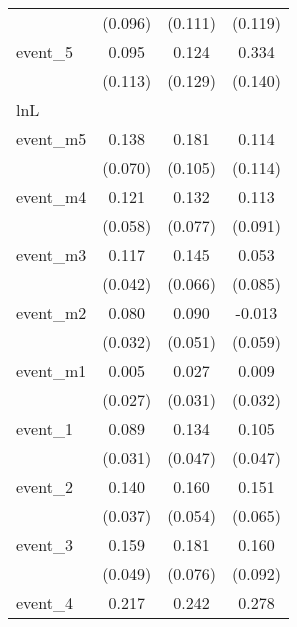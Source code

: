 {\begin{tabular}{l*{3}{c}}
            &     (0.096)         &     (0.111)         &     (0.119)         \\
[1em]
event\_5     &       0.095         &       0.124         &       0.334\sym{*}  \\
            &     (0.113)         &     (0.129)         &     (0.140)         \\
\hline
lnL         &                     &                     &                     \\
event\_m5    &       0.138\sym{*}  &       0.181         &       0.114         \\
            &     (0.070)         &     (0.105)         &     (0.114)         \\
[1em]
event\_m4    &       0.121\sym{*}  &       0.132         &       0.113         \\
            &     (0.058)         &     (0.077)         &     (0.091)         \\
[1em]
event\_m3    &       0.117\sym{**} &       0.145\sym{*}  &       0.053         \\
            &     (0.042)         &     (0.066)         &     (0.085)         \\
[1em]
event\_m2    &       0.080\sym{*}  &       0.090         &      -0.013         \\
            &     (0.032)         &     (0.051)         &     (0.059)         \\
[1em]
event\_m1    &       0.005         &       0.027         &       0.009         \\
            &     (0.027)         &     (0.031)         &     (0.032)         \\
[1em]
event\_1     &       0.089\sym{**} &       0.134\sym{**} &       0.105\sym{*}  \\
            &     (0.031)         &     (0.047)         &     (0.047)         \\
[1em]
event\_2     &       0.140\sym{***}&       0.160\sym{**} &       0.151\sym{*}  \\
            &     (0.037)         &     (0.054)         &     (0.065)         \\
[1em]
event\_3     &       0.159\sym{**} &       0.181\sym{*}  &       0.160         \\
            &     (0.049)         &     (0.076)         &     (0.092)         \\
[1em]
event\_4     &       0.217\sym{***}&       0.242\sym{**} &       0.278\sym{**} \\

\end{tabular}}
